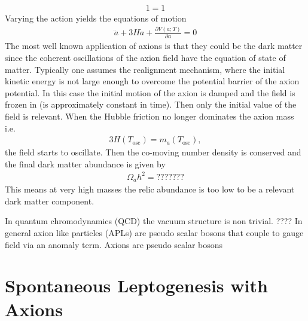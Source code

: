 \documentclass[13pt,a4paper,twoside,titlepage]{article}
\begin{document}
\begin{align}
    1 = 1
\end{align}
Varying the action yields the equations of motion
\begin{align}
    \ddot{a} + 3 H \dot{a} + \frac{\partial V(a; T)}{\partial a} = 0
\end{align}
The most well known application of axions is that they could be the dark matter since
the coherent oscillations of the axion field have the equation of state of matter.
Typically one assumes the realignment mechanism, where the initial kinetic energy is not large enough to overcome the potential barrier of the axion potential. In this case the initial motion of the axion is damped and the field is frozen in (is approximately constant in time). Then only the initial value of the field is relevant.
When the Hubble friction no longer dominates the axion mass i.e.
\begin{align}
    3H(T_\mathrm{osc}) = m_a(T_\mathrm{osc}),
\end{align}
the field starts to oscillate.
Then the co-moving number density is conserved and the final dark matter abundance is given by
\begin{align}
    \Omega_a h^2 = ???????
\end{align}
This means at very high masses the relic abundance is too low to be a relevant dark matter component.

In quantum chromodynamics (QCD) the vacuum structure is non trivial.
????
In general axion like particles (APLs) are pseudo scalar bosons that couple
to gauge field via an anomaly term.
Axions are pseudo scalar bosons



\section{Spontaneous Leptogenesis with Axions}
\label{sec:spont_bg_lepto_with_axions}
\end{document}
